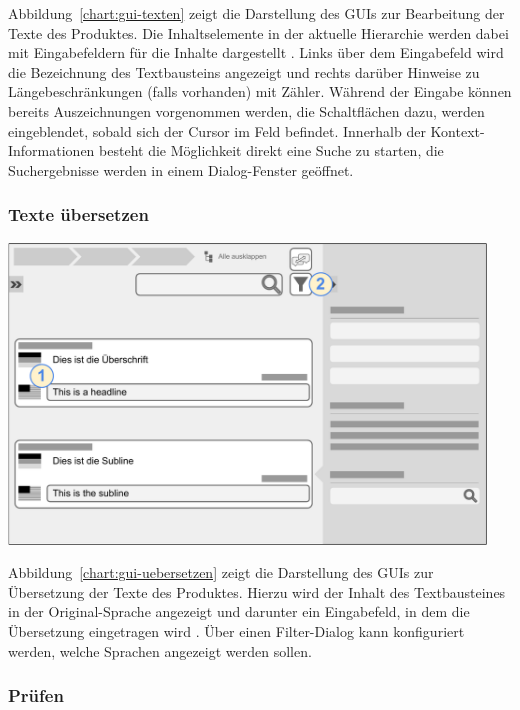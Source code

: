 Abbildung~\ref{chart:gui-texten} zeigt die Darstellung des GUIs zur Bearbeitung der Texte des Produktes. Die Inhaltselemente in der aktuelle Hierarchie werden dabei mit Eingabefeldern für die Inhalte dargestellt . Links über dem Eingabefeld wird die Bezeichnung des Textbausteins angezeigt und rechts darüber Hinweise zu Längebeschränkungen (falls vorhanden) mit Zähler. Während der Eingabe können bereits Auszeichnungen vorgenommen werden, die Schaltflächen dazu, werden eingeblendet, sobald sich der Cursor im Feld befindet. Innerhalb der Kontext-Informationen  besteht die Möglichkeit direkt eine Suche zu starten, die Suchergebnisse werden in einem Dialog-Fenster geöffnet. 

\subsubsection{Texte übersetzen}\label{l:gui-uebersetzen}

\begin{center}
\includegraphics[width=0.95\textwidth]{media/GUITexteuebersetzen.pdf}
\label{chart:gui-uebersetzen}
\end{center}

Abbildung~\ref{chart:gui-uebersetzen} zeigt die Darstellung des GUIs zur Übersetzung der Texte des Produktes. Hierzu wird der Inhalt des Textbausteines in der Original-Sprache angezeigt und darunter ein Eingabefeld, in dem die Übersetzung eingetragen wird . Über einen Filter-Dialog  kann konfiguriert werden, welche Sprachen angezeigt werden sollen.

\subsubsection{Prüfen}\label{l:gui-qs}


